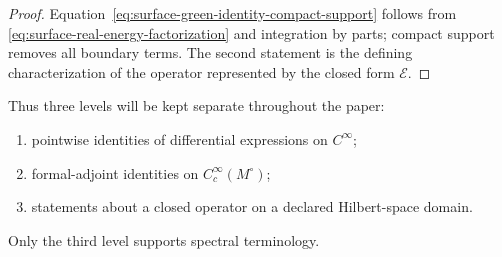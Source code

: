 \begin{proof}
Equation~\eqref{eq:surface-green-identity-compact-support} follows from
\eqref{eq:surface-real-energy-factorization} and integration by parts; compact
support removes all boundary terms.  The second statement is the defining
characterization of the operator represented by the closed form
$\mathcal E$.
\end{proof}

Thus three levels will be kept separate throughout the paper:
\begin{enumerate}
 \item pointwise identities of differential expressions on $C^\infty$;
 \item formal-adjoint identities on $C_c^\infty(M^\circ)$;
 \item statements about a closed operator on a declared Hilbert-space domain.
\end{enumerate}
Only the third level supports spectral terminology.
